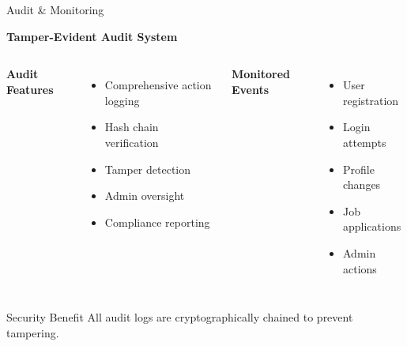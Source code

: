 \documentclass[aspectratio=169]{beamer}
\begin{document}
\begin{frame}{Audit \& Monitoring}
\begin{center}
\textbf{Tamper-Evident Audit System}
\end{center}

\begin{columns}
\textbf{Audit Features}
\begin{itemize}
    \item Comprehensive action logging
    \item Hash chain verification
    \item Tamper detection
    \item Admin oversight
    \item Compliance reporting
\end{itemize}

\textbf{Monitored Events}
\begin{itemize}
    \item User registration
    \item Login attempts
    \item Profile changes
    \item Job applications
    \item Admin actions
\end{itemize}
\end{columns}

\vspace{0.3cm}
\begin{exampleblock}{Security Benefit}
All audit logs are cryptographically chained to prevent tampering.
\end{exampleblock}
\end{frame}
\end{document}
